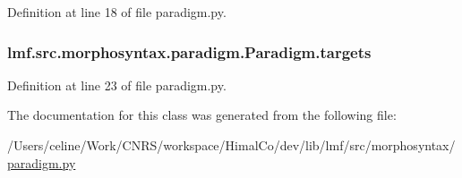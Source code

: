 Definition at line 18 of file paradigm.\+py.

\hypertarget{classlmf_1_1src_1_1morphosyntax_1_1paradigm_1_1_paradigm_a546af1d9fc21b3b1a6d102e39877a587}{
\subsubsection[{targets}]{\setlength{\rightskip}{0pt plus 5cm}lmf.\+src.\+morphosyntax.\+paradigm.\+Paradigm.\+targets}}\label{classlmf_1_1src_1_1morphosyntax_1_1paradigm_1_1_paradigm_a546af1d9fc21b3b1a6d102e39877a587}


Definition at line 23 of file paradigm.\+py.



The documentation for this class was generated from the following file\+:\begin{DoxyCompactItemize}
\item 
/\+Users/celine/\+Work/\+C\+N\+R\+S/workspace/\+Himal\+Co/dev/lib/lmf/src/morphosyntax/\hyperlink{paradigm_8py}{paradigm.\+py}\end{DoxyCompactItemize}
